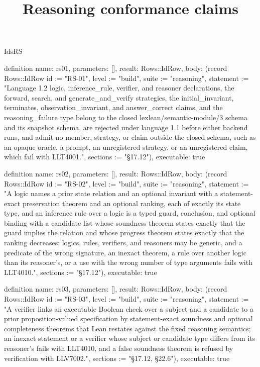\begin{lexlean}{IdsRS}
\title{Reasoning conformance claims}
\begin{semanticmodule}
definition{
  name: rs01,
  parameters: [],
  result: Rows::IdRow,
  body: (record Rows::IdRow {id := "RS-01", level := "build", suite := "reasoning", statement := "Language 1.2 logic, inference_rule, verifier, and reasoner declarations, the forward, search, and generate_and_verify strategies, the initial_invariant, terminates, observation_invariant, and answer_correct claims, and the reasoning_failure type belong to the closed lexlean/semantic-module/3 schema and its snapshot schema, are rejected under language 1.1 before either backend runs, and admit no member, strategy, or claim outside the closed schema, such as an opaque oracle, a prompt, an unregistered strategy, or an unregistered claim, which fail with LLT4001.", sections := "§17.12"}),
  executable: true
}

definition{
  name: rs02,
  parameters: [],
  result: Rows::IdRow,
  body: (record Rows::IdRow {id := "RS-02", level := "build", suite := "reasoning", statement := "A logic names a prior state relation and an optional invariant with a statement-exact preservation theorem and an optional ranking, each of exactly its state type, and an inference rule over a logic is a typed guard, conclusion, and optional binding with a candidate list whose soundness theorem states exactly that the guard implies the relation and whose progress theorem states exactly that the ranking decreases; logics, rules, verifiers, and reasoners may be generic, and a predicate of the wrong signature, an inexact theorem, a rule over another logic than its reasoner's, or a use with the wrong number of type arguments fails with LLT4010.", sections := "§17.12"}),
  executable: true
}

definition{
  name: rs03,
  parameters: [],
  result: Rows::IdRow,
  body: (record Rows::IdRow {id := "RS-03", level := "build", suite := "reasoning", statement := "A verifier links an executable Boolean check over a subject and a candidate to a prior proposition-valued specification by statement-exact soundness and optional completeness theorems that Lean restates against the fixed reasoning semantics; an inexact statement or a verifier whose subject or candidate type differs from its reasoner's fails with LLT4010, and a false soundness theorem is refused by verification with LLV7002.", sections := "§17.12, §22.6"}),
  executable: true
}


\end{semanticmodule}
\end{lexlean}

